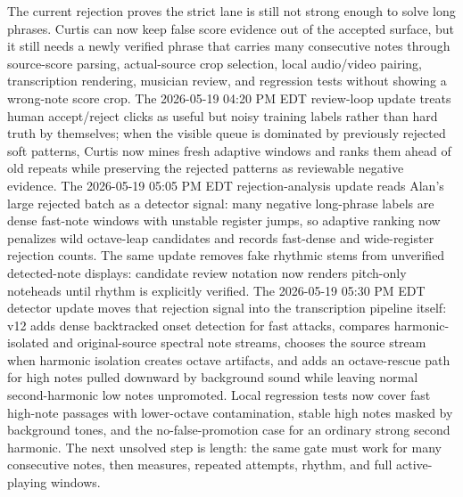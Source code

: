 \documentclass[12pt,letterpaper]{article}
\begin{document}
The current rejection proves the strict lane is still not strong enough to solve long phrases. Curtis can now keep false score evidence out of the accepted surface, but it still needs a newly verified phrase that carries many consecutive notes through source-score parsing, actual-source crop selection, local audio/video pairing, transcription rendering, musician review, and regression tests without showing a wrong-note score crop. The 2026-05-19 04:20 PM EDT review-loop update treats human accept/reject clicks as useful but noisy training labels rather than hard truth by themselves; when the visible queue is dominated by previously rejected soft patterns, Curtis now mines fresh adaptive windows and ranks them ahead of old repeats while preserving the rejected patterns as reviewable negative evidence. The 2026-05-19 05:05 PM EDT rejection-analysis update reads Alan's large rejected batch as a detector signal: many negative long-phrase labels are dense fast-note windows with unstable register jumps, so adaptive ranking now penalizes wild octave-leap candidates and records fast-dense and wide-register rejection counts. The same update removes fake rhythmic stems from unverified detected-note displays: candidate review notation now renders pitch-only noteheads until rhythm is explicitly verified. The 2026-05-19 05:30 PM EDT detector update moves that rejection signal into the transcription pipeline itself: v12 adds dense backtracked onset detection for fast attacks, compares harmonic-isolated and original-source spectral note streams, chooses the source stream when harmonic isolation creates octave artifacts, and adds an octave-rescue path for high notes pulled downward by background sound while leaving normal second-harmonic low notes unpromoted. Local regression tests now cover fast high-note passages with lower-octave contamination, stable high notes masked by background tones, and the no-false-promotion case for an ordinary strong second harmonic. The next unsolved step is length: the same gate must work for many consecutive notes, then measures, repeated attempts, rhythm, and full active-playing windows.
\end{document}
